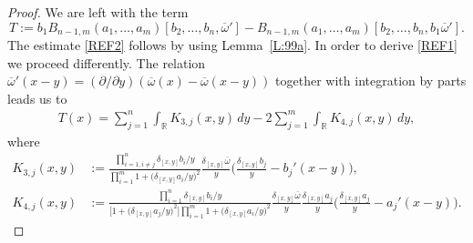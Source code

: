 \documentclass[11pt,reqno]{amsart}
\numberwithin{equation}{section}
\newcommand{\0}{\Omega}
\newcommand{\p}{\partial}
\newcommand{\ov}{\overline}
\newcommand{\oo}{\ov\omega}
\newcommand{\R}{\mathbb{R}}
\numberwithin{equation}{section}
\begin{document}
\begin{proof}
We are left  with the term
\[T:=b_1B_{n-1,m}(a_1,\ldots, a_{m})[b_2,\ldots, b_n, \oo'] -B_{n-1,m}(a_1,\ldots, a_{m})[b_2,\ldots, b_n, b_1\oo'].\]
The estimate  \eqref{REF2} follows  by using Lemma~\ref{L:99a}. In order to derive \eqref{REF1} we proceed differently. 
The relation $\oo'(x-y)=(\p/\p y) (\oo(x)-\oo(x-y))$ together with integration by parts leads us to  
\begin{align*}
T(x)=\sum_{j=1}^n \int_\R K_{3,j}(x,y)\, dy -2\sum_{j=1}^m\int_\R K_{4,j}(x,y)\, dy,
\end{align*}
where
\begin{align*}
K_{3,j}(x,y)&:= \frac{\prod_{i=1, i\neq j}^n \delta_{[x,y]}b_i/y}{\prod_{i=1}^m 1+ \big(\delta_{[x,y]}a_i/y\big)^2}\frac{\delta_{[x,y]}\oo}{y}\Big(\frac{\delta_{[x,y]}b_j}{y}- b_j'(x-y)\Big),\\[1ex]
K_{4,j}(x,y)&:= \frac{\prod_{i=1}^n \delta_{[x,y]}b_i/y}{\big[1+ \big(\delta_{[x,y]}a_j/y\big)^2\big]\prod_{i=1}^m 1+ \big(\delta_{[x,y]}a_i/y\big)^2}\frac{\delta_{[x,y]}\oo}{y}\frac{\delta_{[x,y]}a_j}{y}\Big(\frac{\delta_{[x,y]}a_j}{y}- a_j'(x-y)\Big) .
\end{align*}


\end{proof}
\end{document}
